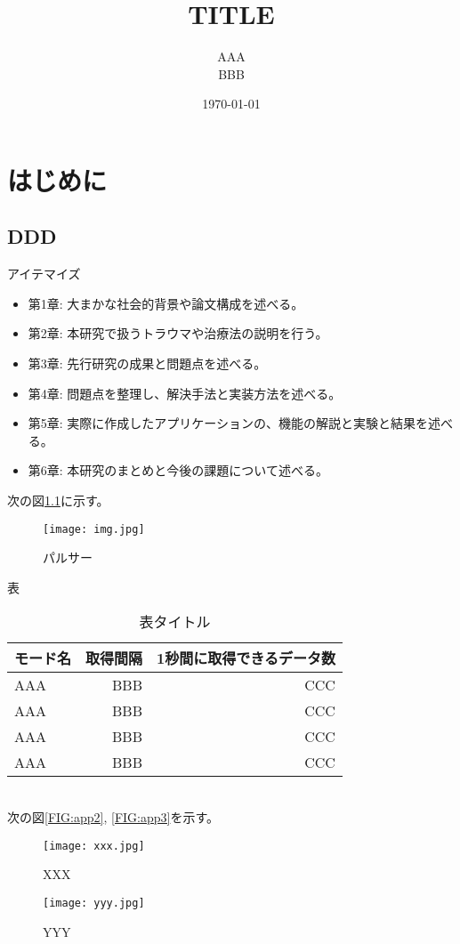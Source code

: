 \documentclass[a4paper,12pt,uplatex]{jsreport}
\title{TITLE}
\author{AAA\\BBB}
\date{\today}
\begin{document}
\maketitle
\tableofcontents

\chapter{はじめに}
\section{DDD}

アイテマイズ
\begin{itemize}
	\item 第1章: 大まかな社会的背景や論文構成を述べる。
	\item 第2章: 本研究で扱うトラウマや治療法の説明を行う。
	\item 第3章: 先行研究の成果と問題点を述べる。
	\item 第4章: 問題点を整理し、解決手法と実装方法を述べる。
	\item 第5章: 実際に作成したアプリケーションの、機能の解説と実験と結果を述べる。
	\item 第6章: 本研究のまとめと今後の課題について述べる。
\end{itemize}


次の図\ref{FIG:p1}に示す。
\begin{figure}[h]
	\fontsize{12pt}{0cm}\selectfont
	\centering
	\renewcommand{\figurename}{図}
	\texttt{[image: img.jpg]}
	\caption{パルサー}
	\label{FIG:p1}
\end{figure}

表
\begin{table}[htbp]
    \caption{表タイトル}
    \centering
    \begin{tabular}{|l||r|r|}
        \hline
        モード名 & 取得間隔 & 1秒間に取得できるデータ数\\
        \hline
        \hline
        AAA & BBB & CCC\\
        \hline
        AAA & BBB & CCC\\
        \hline
        AAA & BBB & CCC\\
        \hline
        AAA & BBB & CCC\\
        \hline
    \end{tabular}
    \label{TB:1}
\end{table}\\


次の図\ref{FIG:app2}, \ref{FIG:app3}を示す。\\
\begin{figure}[htbp]
	\begin{minipage}[b]{0.45\linewidth}
		\centering
		\texttt{[image: xxx.jpg]}
		\caption{XXX}
		\label{FIG:yyy}
	\end{minipage}
	\begin{minipage}[b]{0.45\linewidth}
		\centering
		\texttt{[image: yyy.jpg]}
		\caption{YYY}
		\label{FIG:xxx}
	\end{minipage}
\end{figure}\\
\end{document}
